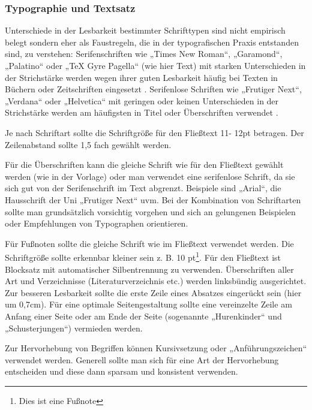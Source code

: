 \subsubsection{Typographie und Textsatz}\label{subsubsec:typographie}

Unterschiede in der Lesbarkeit bestimmter Schrifttypen sind nicht empirisch belegt sondern eher als Faustregeln, die in der typografischen Praxis entstanden sind, zu verstehen:  Serifenschriften wie „Times New Roman“, „Garamond“, „Palatino“ oder „TeX Gyre Pagella“ (wie hier Text)  mit starken Unterschieden in der Strichstärke werden wegen ihrer guten Lesbarkeit häufig bei Texten in Büchern oder Zeitschriften eingesetzt \cite[S.18]{gotz2004typo}. Serifenlose Schriften wie „Frutiger Next“, „Verdana“ oder „Helvetica“ mit geringen oder keinen Unterschieden in der Strichstärke werden am häufigsten in Titel oder Überschriften verwendet \cite[S.18]{gotz2004typo}. 

  Je nach Schriftart sollte die Schriftgröße für den Fließtext 11- 12pt betragen. Der Zeilenabstand sollte 1,5 fach gewählt werden.

Für die Überschriften kann die gleiche Schrift wie für den Fließtext gewählt werden (wie in der Vorlage) oder man verwendet eine serifenlose Schrift, da sie sich gut von der Serifenschrift im Text abgrenzt. Beispiele sind „Arial“, die Hausschrift der Uni „Frutiger Next“ uvm. Bei der Kombination von Schriftarten sollte man grundsätzlich vorsichtig vorgehen und sich an gelungenen Beispielen oder Empfehlungen von Typographen orientieren. 

Für Fußnoten sollte die gleiche Schrift wie im Fließtext verwendet werden. Die Schriftgröße sollte erkennbar kleiner sein z. B. 10 pt\footnote{Dies ist eine Fußnote}. Für den Fließtext ist Blocksatz mit automatischer Silbentrennung zu verwenden. Überschriften aller Art und Verzeichnisse (Literaturverzeichnis etc.) werden linksbündig ausgerichtet. Zur besseren Lesbarkeit sollte die erste Zeile eines Absatzes eingerückt sein (hier um 0,7cm). Für eine optimale Seitengestaltung sollte eine vereinzelte Zeile am Anfang einer Seite oder am Ende der Seite (sogenannte „Hurenkinder“ und „Schusterjungen“) vermieden werden.

Zur Hervorhebung von Begriffen können Kursivsetzung oder „Anführungszeichen“ verwendet werden. Generell sollte man sich für eine Art der Hervorhebung entscheiden und diese dann sparsam und  konsistent verwenden. 

